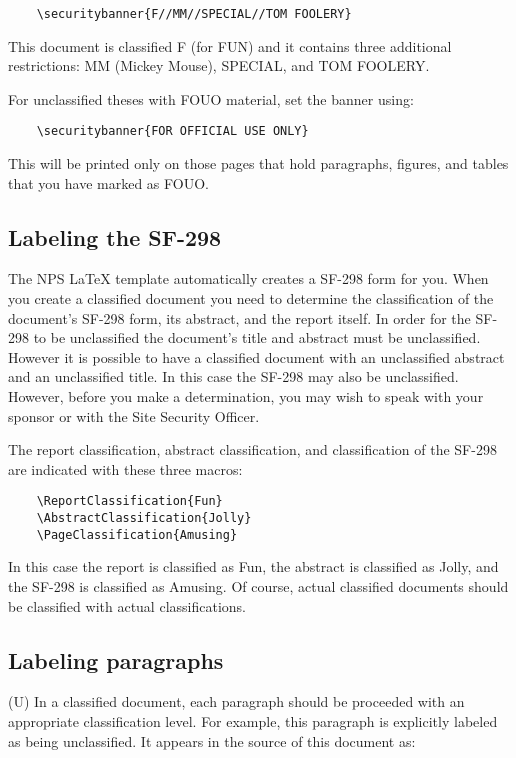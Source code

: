 \begin{Verbatim}
    \securitybanner{F//MM//SPECIAL//TOM FOOLERY}
\end{Verbatim}

This document is classified F (for FUN) and it contains three
additional restrictions: MM (Mickey Mouse), SPECIAL, and TOM FOOLERY.

For unclassified theses with FOUO material, set the banner using:
\begin{Verbatim}
    \securitybanner{FOR OFFICIAL USE ONLY}
\end{Verbatim}
This will be printed only on those pages that hold 
paragraphs, figures, and tables that you have marked as FOUO.


\subsection{Labeling the SF-298}
The NPS \LaTeX{} template automatically creates a SF-298 form for
you. When you create a classified document you need to determine the
classification of the document's SF-298 form, its abstract, and the
report itself. In order for the SF-298 to be unclassified the
document's title and abstract must be unclassified. However it is
possible to have a classified document with an unclassified abstract
and an unclassified title. In this case the SF-298 may also be
unclassified. However, before you make a determination, you may wish
to speak with your sponsor or with the Site Security Officer. 

The report classification, abstract classification, and classification
of the SF-298 are indicated with these three macros:
\begin{Verbatim}
    \ReportClassification{Fun}
    \AbstractClassification{Jolly}
    \PageClassification{Amusing}
\end{Verbatim}

In this case the report is classified as Fun, the abstract is classified
as Jolly, and the SF-298 is classified as Amusing. Of course, actual 
classified documents should be classified with actual classifications.


\subsection{Labeling paragraphs}
(U) In a classified document, each paragraph should be proceeded with an
appropriate classification level. For example, this paragraph is
explicitly labeled as being unclassified. It appears in the source of
this document as:

